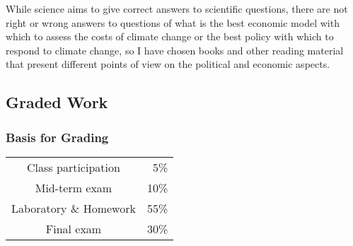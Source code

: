 \documentclass[11pt,twoside]{jgsyllabus}\usepackage[]{graphicx}\usepackage[]{color}
\begin{document}
While science aims to give correct answers to scientific questions, there are
not right or wrong answers to questions of what is the best economic model with
which to assess the costs of climate change or the best policy with which
to respond to climate change, so I have chosen books and other reading material
that present different points of view on the political and economic aspects.
\iffalse

\subsubsection[Optional Reading]{Optional Supplementary Reading Materials}
See the ``External Links'' page on the course Brightspace site for links to
optional supplementary materials that you can read on-line or download free.
\fi

\subsection{Graded Work}
%
%
%
\subsubsection[Grading]{Basis for Grading}

\begin{center}
	\begin{tabular}[t]{cr}
		Class participation & 5\%\\
		Mid-term exam & 10\%\\
		Laboratory \& Homework & 55\%\\
		Final exam   & 30\%\\
	\end{tabular}
\end{center}
%
\iffalse
\subsubsection[Participation]{Participation}
To make sure that people who are taking the course asynchronously have lots of
opportunity to participate in discussions, I will be putting discussion
questions on the Brightspace discussion board each week and you will get
participation credit for posting on the discussion boards and responding to
other students' posts. %

I am also setting up discussion boards for questions about the readings and
lectures and labs. I encourage you to ask on those boards about anything that
you didn't understand or thought was unclear, or would like to see me cover %
in greater detail in future classes.
\fi
%
%
%
\iffalse
\end{document}
